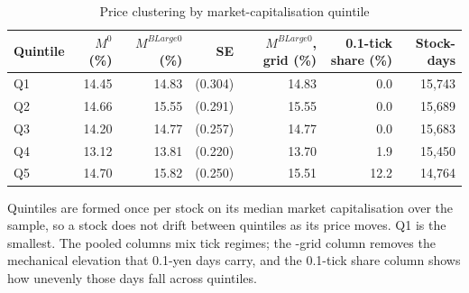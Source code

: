 \begin{table}[htbp]
\centering
\caption{Price clustering by market-capitalisation quintile}
\label{tab:size}
\small
\begin{threeparttable}
\begin{tabular}{@{}lrrrrrr@{}}
\toprule
Quintile & $M^{0}$ (\%) & $M^{BLarge0}$ (\%) & SE & $M^{BLarge0}$, \textyen 1 grid (\%) & 0.1-tick share (\%) & Stock-days \\
\midrule
Q1 & 14.45 & 14.83 & (0.304) & 14.83 & 0.0 & 15,743 \\
Q2 & 14.66 & 15.55 & (0.291) & 15.55 & 0.0 & 15,689 \\
Q3 & 14.20 & 14.77 & (0.257) & 14.77 & 0.0 & 15,683 \\
Q4 & 13.12 & 13.81 & (0.220) & 13.70 & 1.9 & 15,450 \\
Q5 & 14.70 & 15.82 & (0.250) & 15.51 & 12.2 & 14,764 \\
\bottomrule
\end{tabular}
\begin{tablenotes}[flushleft]\footnotesize
\item Quintiles are formed once per stock on its median market capitalisation over the sample, so a stock does not drift between quintiles as its price moves. Q1 is the smallest. The pooled columns mix tick regimes; the -grid column removes the mechanical elevation that 0.1-yen days carry, and the 0.1-tick share column shows how unevenly those days fall across quintiles.
\end{tablenotes}
\end{threeparttable}
\end{table}
